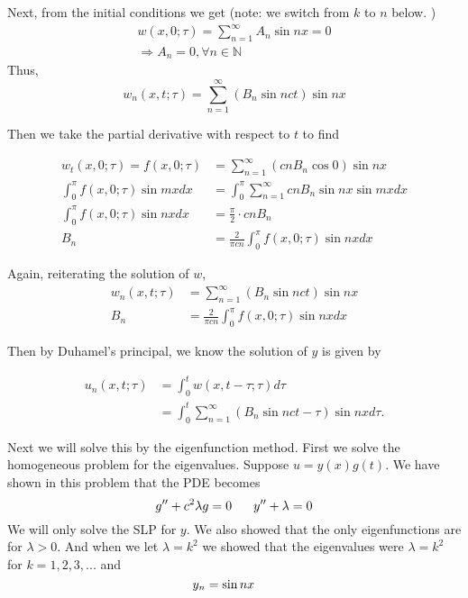 \documentclass{article}
\begin{document}
Next, from the initial conditions we get  (note: we switch from \(k\) to \(n\) below. )
\begin{align*}
w(x,0;\tau )=\sum_{n=1}^\infty A_n \sin nx = 0 \\
\Rightarrow A_n=0,  \forall n \in \mathbb{N} 
\end{align*}
Thus, 
\[w_n(x,t;\tau) = \sum_{n=1}^\infty ( B_n \sin nct)\sin nx   \]

Then we take the partial derivative with respect to \(t\) to find 

\begin{align*}
w_t(x,0;\tau) = f(x,0;\tau) &= \sum_{n=1}^\infty ( cn B_n \cos 0)\sin nx \\
\int_0^\pi f(x,0;\tau)\sin mx dx&=\int_0^\pi \sum_{n=1}^\infty cnB_n\sin nx \sin mx dx \\
\int_0^\pi f(x,0;\tau)\sin nx dx&= \frac{\pi}{2} \cdot cn B_n \\
B_n &=\frac{2}{\pi cn}  \int_0^\pi f(x,0;\tau)\sin nx dx 
\end{align*}

Again, reiterating the solution of \(w\), 
\begin{align*}
w_n(x,t;\tau)&= \sum_{n=1}^\infty ( B_n \sin nct)\sin nx \\
B_n &=\frac{2}{\pi cn}  \int_0^\pi f(x,0;\tau)\sin nx dx 
\end{align*}

Then by Duhamel's principal, we know the solution of \(y\) is given by 

\begin{align*}
u_n(x,t;\tau)&= \int_0^t w(x,t-\tau;\tau) d\tau\\
&= \int_0^t  \sum_{n=1}^\infty ( B_n \sin nct-\tau)\sin nx d\tau. 
\end{align*}


\newpage

Next we will solve this by the eigenfunction method.  
First we solve the homogeneous problem for the eigenvalues. Suppose \(u=y(x)g(t)\). We have shown in this problem that the PDE becomes
\[
g'' + c^2\lambda g = 0  \hspace{6mm}  y''+\lambda = 0
\]
We will only solve the SLP for \(y\). We also showed that the only eigenfunctions are for \(\lambda>0\). And when we let \(\lambda = k^2\) we showed that the eigenvalues were \(\lambda = k^2 \) for \( k=1,2,3,... \) and 
\[
y_n= \sin nx   \hspace{6mm}  
\]
\end{document}

